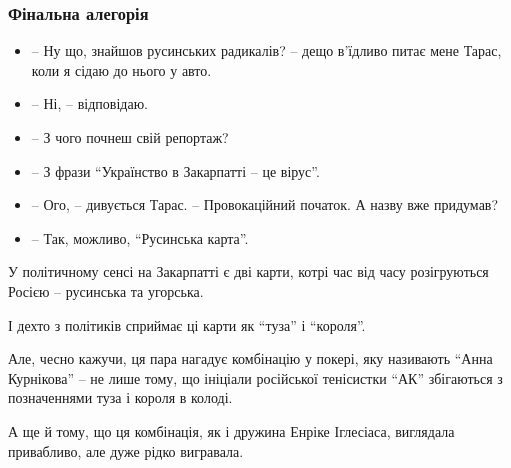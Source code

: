  
 
 

\subsubsection{Фінальна алегорія}

\begin{itemize}
  \item – Ну що, знайшов русинських радикалів? – дещо в’їдливо питає мене Тарас, коли я сідаю до нього у авто.
  \item – Ні, – відповідаю.
  \item – З чого почнеш свій репортаж?
  \item – З фрази \enquote{Українство в Закарпатті – це вірус}.
  \item – Ого, – дивується Тарас. – Провокаційний початок. А назву вже придумав?
  \item – Так, можливо, \enquote{Русинська карта}.
\end{itemize}

У політичному сенсі на Закарпатті є дві карти, котрі час від часу розігруються
Росією – русинська та угорська.

І дехто з політиків сприймає ці карти як \enquote{туза} і \enquote{короля}.

Але, чесно кажучи, ця пара нагадує комбінацію у покері, яку називають \enquote{Анна
Курнікова} – не лише тому, що ініціали російської тенісистки \enquote{АК} збігаються з
позначеннями туза і короля в колоді.

А ще й тому, що ця комбінація, як і дружина Енріке Іглесіаса, виглядала
привабливо, але дуже рідко вигравала.

